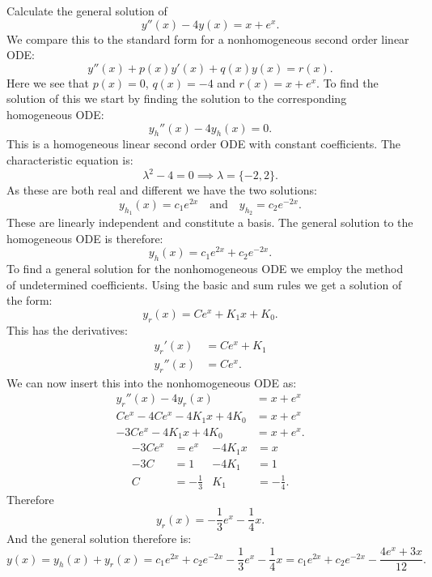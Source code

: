 \documentclass[a4paper]{article}
\begin{document}
Calculate the general solution of
\[ 
y''(x) - 4y(x) = x + e^{x}
.\]
\bigbreak
We compare this to the standard form for a nonhomogeneous second order linear ODE:
\[ 
y''(x) + p(x) y'(x) + q(x) y(x) = r(x)
.\]
Here we see that $p(x) = 0$, $q(x) = -4$ and $r(x) = x + e^{x}$. To find the solution of this we start by finding the solution to the corresponding homogeneous ODE:
\[ 
y_h''(x) - 4y_h(x) = 0
.\]
This is a homogeneous linear second order ODE with constant coefficients. The characteristic equation is:
\[ 
  \lambda^2 - 4 = 0 \implies \lambda = \{-2, 2\}
.\]
As these are both real and different we have the two solutions:
\[ 
y_{h_1}(x) = c_1 e^{2x} \quad \text{and} \quad y_{h_2} = c_2 e^{-2x}
.\]
These are linearly independent and constitute a basis. The general solution to the homogeneous ODE is therefore:
\[ 
y_h(x) = c_1 e^{2x} + c_2 e^{-2x}
.\]
To find a general solution for the nonhomogeneous ODE we employ the method of undetermined coefficients. Using the basic and sum rules we get a solution of the form:
\[ 
y_r(x) = C e^{x} + K_1 x + K_0
.\]
This has the derivatives:
\begin{align*}
  y_r'(x) &= C e^x + K_1 \\
  y_r''(x) &= C e^{x}
.\end{align*}
We can now insert this into the nonhomogeneous ODE as:
\begin{align*}
  y_r''(x) - 4y_r(x) &= x + e^{x} \\
  C e^{x} - 4C e^{x} - 4K_1 x + 4K_0 &= x + e^{x} \\
  -3 C e^{x}  - 4K_1 x + 4K_0 &= x + e^{x}
.\end{align*}
\begin{align*}
  -3 C e^{x} &= e^{x} & -4 K_1 x &= x \\
  -3 C &= 1 & -4K_1 &= 1 \\
  C &= - \frac{1}{3} & K_1 &= -\frac{1}{4}
.\end{align*}
Therefore
\[ 
y_r(x) = -\frac{1}{3} e^{x} - \frac{1}{4}x
.\]
And the general solution therefore is:
\[ 
y(x) = y_h(x) + y_r(x) = c_1 e^{2x} + c_2 e^{-2x} - \frac{1}{3} e^{x} - \frac{1}{4} x = c_1 e^{2x} + c_2 e^{-2x} - \frac{4e^{x} + 3x}{12}
.\]
\end{document}
